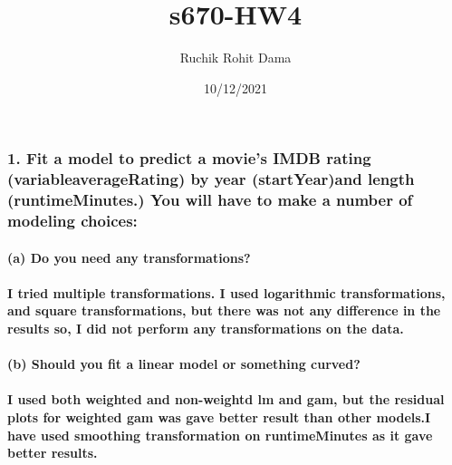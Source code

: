 \documentclass[
]{article}
\title{s670-HW4}
\author{Ruchik Rohit Dama}
\date{10/12/2021}
\begin{document}
\maketitle

\hypertarget{fit-a-model-to-predict-a-movies-imdb-rating-variableaveragerating-by-year-startyearand-length-runtimeminutes.-you-will-have-to-make-a-number-of-modeling-choices}{%
\subsubsection{1. Fit a model to predict a movie's IMDB rating
(variableaverageRating) by year (startYear)and length (runtimeMinutes.)
You will have to make a number of modeling
choices:}\label{fit-a-model-to-predict-a-movies-imdb-rating-variableaveragerating-by-year-startyearand-length-runtimeminutes.-you-will-have-to-make-a-number-of-modeling-choices}}

\hypertarget{a-do-you-need-any-transformations}{%
\paragraph{(a) Do you need any
transformations?}\label{a-do-you-need-any-transformations}}

\hypertarget{i-tried-multiple-transformations.-i-used-logarithmic-transformations-and-square-transformations-but-there-was-not-any-difference-in-the-results-so-i-did-not-perform-any-transformations-on-the-data.}{%
\paragraph{I tried multiple transformations. I used logarithmic
transformations, and square transformations, but there was not any
difference in the results so, I did not perform any transformations on
the
data.}\label{i-tried-multiple-transformations.-i-used-logarithmic-transformations-and-square-transformations-but-there-was-not-any-difference-in-the-results-so-i-did-not-perform-any-transformations-on-the-data.}}

\hypertarget{b-should-you-fit-a-linear-model-or-something-curved}{%
\paragraph{(b) Should you fit a linear model or something
curved?}\label{b-should-you-fit-a-linear-model-or-something-curved}}

\hypertarget{i-used-both-weighted-and-non-weightd-lm-and-gam-but-the-residual-plots-for-weighted-gam-was-gave-better-result-than-other-models.i-have-used-smoothing-transformation-on-runtimeminutes-as-it-gave-better-results.}{%
\paragraph{I used both weighted and non-weightd lm and gam, but the
residual plots for weighted gam was gave better result than other
models.I have used smoothing transformation on runtimeMinutes as it gave
better
results.}\label{i-used-both-weighted-and-non-weightd-lm-and-gam-but-the-residual-plots-for-weighted-gam-was-gave-better-result-than-other-models.i-have-used-smoothing-transformation-on-runtimeminutes-as-it-gave-better-results.}}
\end{document}
